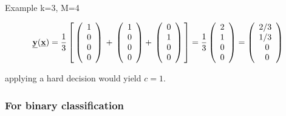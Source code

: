 \begin{frame}
Example k=3, M=4

\begin{equation}
\vec y(\vec x) = \frac{1}{3}
\left\lbrack
\,
\rmat{ 1 \\ 0 \\ 0 \\ 0}\, +\,
\rmat{ 1 \\ 0 \\ 0 \\ 0} +\,
\rmat{ 0 \\ 1 \\ 0 \\ 0}\,
\right\rbrack
=
\frac{1}{3}
\rmat{ 2 \\ 1 \\ 0 \\ 0}
=
\rmat{ 2/3 \\ 1/3 \\ 0\; \\ 0\;}
\end{equation}

applying a hard decision would yield $c=1$.
    
\end{frame}

\subsubsection{For binary classification}

